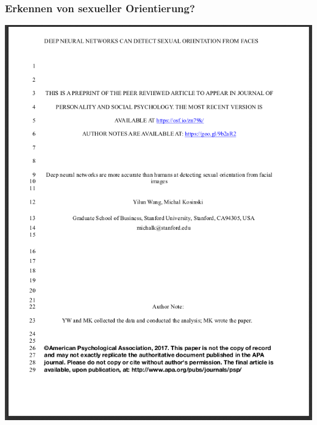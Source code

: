 \documentclass[aspectratio=169,x11names]{beamer}
\begin{document}
\begin{frame}
\frametitle{Erkennen von sexueller Orientierung?}
\begin{minipage}{.6\textwidth}
\begin{center}
\includegraphics[height=0.75\textheight, keepaspectratio]{images/paper_orientation}
\end{center}
\end{minipage}\hspace*{-25pt}\begin{minipage}{.4\textwidth}
\begin{center}

\end{center}
\end{minipage}
\end{frame}
\end{document}
